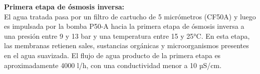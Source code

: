 \textbf{Primera etapa de ósmosis inversa:}\\
El agua tratada pasa por un filtro de cartucho de 5 micrómetros (CF50A) y luego es impulsada por la bomba P50-A hacia la primera etapa de ósmosis inversa a una presión entre 9 y 13 bar y una temperatura entre 15 y 25°C. En esta etapa, las membranas retienen sales, sustancias orgánicas y microorganismos presentes en el agua suavizada. El flujo de agua producto de la primera etapa es aproximadamente 4000 l/h, con una conductividad menor a 10 µS/cm.

